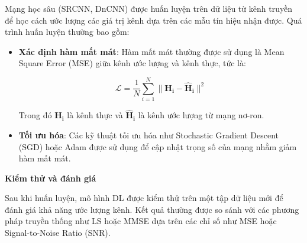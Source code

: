 Mạng học sâu (SRCNN, DnCNN) được huấn luyện trên dữ liệu từ kênh truyền để học cách ước lượng các giá trị kênh dựa trên các mẫu tín hiệu nhận được. 
Quá trình huấn luyện thường bao gồm:

\begin{itemize}
    \item \textbf{Xác định hàm mất mát}: Hàm mất mát thường được sử dụng là Mean Square Error (MSE) giữa kênh ước lượng và kênh thực, tức là:

    \begin{equation}
        \mathcal{L} = \frac{1}{N} \sum_{i=1}^{N} \| \bm{H_i} - \bm{\hat{H}_i} \|^2
    \end{equation}
    
    Trong đó \( \bm{H_i} \) là kênh thực và \( \bm{\hat{H}_i} \) là kênh ước lượng từ mạng nơ-ron.

    \item \textbf{Tối ưu hóa}: Các kỹ thuật tối ưu hóa như Stochastic Gradient Descent (SGD) hoặc Adam được sử dụng để cập nhật trọng số của mạng nhằm giảm hàm mất mát.
\end{itemize}

\textbf{Kiểm thử và đánh giá}

Sau khi huấn luyện, mô hình DL được kiểm thử trên một tập dữ liệu mới để đánh giá khả năng ước lượng kênh. 
Kết quả thường được so sánh với các phương pháp truyền thống như LS hoặc MMSE dựa trên các chỉ số như MSE hoặc Signal-to-Noise Ratio (SNR).
